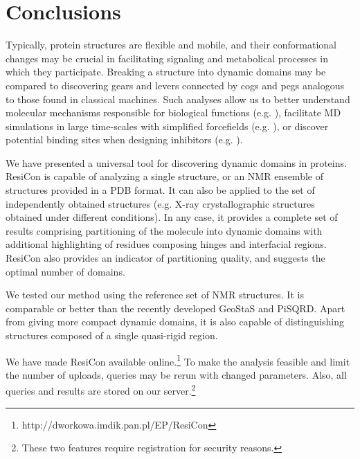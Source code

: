 \section{Conclusions}
Typically, protein structures are flexible and mobile, and their conformational changes may be crucial in facilitating signaling and metabolical processes in which they participate.
Breaking a structure into dynamic domains may be compared to discovering gears and levers connected by cogs and pegs analogous to those found in classical machines.
Such analyses allow us to better understand molecular mechanisms responsible for biological functions (e.g. \cite{taylor2013classification}), facilitate MD simulations in large time-scales with simplified forcefields (e.g. \cite{sinitskiy2012optimal}), or discover potential binding sites when designing inhibitors (e.g. \cite{zhang2009defining}).

We have presented a universal tool for discovering dynamic domains in proteins.
ResiCon is capable of analyzing a single structure, or an NMR ensemble of structures provided in a PDB format.
It can also be applied to the set of independently obtained structures (e.g. X-ray crystallographic structures obtained under different conditions).
In any case, it provides a complete set of results comprising partitioning of the molecule into dynamic domains with additional highlighting of residues composing hinges and interfacial regions.
ResiCon also provides an indicator of partitioning quality, and suggests the optimal number of domains.

We tested our method using the reference set of NMR structures.
It is comparable or better than the recently developed GeoStaS and PiSQRD.
Apart from giving more compact dynamic domains, it is also capable of distinguishing structures composed of a single quasi-rigid region.

We have made ResiCon available online.\footnote{http://dworkowa.imdik.pan.pl/EP/ResiCon}
To make the analysis feasible and limit the number of uploads, queries may be rerun with changed parameters.
Also, all queries and results are stored on our server.\footnote{These two features require registration for security reasons.}


